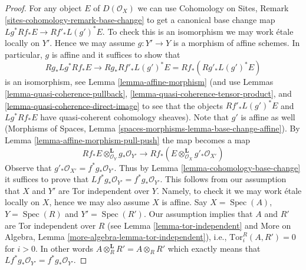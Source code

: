 \documentclass[10pt,a4paper]{amsart}
\theoremstyle{plain}
\theoremstyle{definition}
\theoremstyle{remark}
\numberwithin{equation}{subsection}
\def\Spec{\mathop{\mathrm{Spec}}}
\begin{document}
\begin{proof}
For any object $E$ of $D(\mathcal{O}_X)$ we can use
Cohomology on Sites, Remark \ref{sites-cohomology-remark-base-change}
to get a canonical base change map $Lg^*Rf_*E \to Rf'_*L(g')^*E$. To check this
is an isomorphism we may work \'etale locally on $Y'$. Hence we may assume
$g : Y' \to Y$ is a morphism of affine schemes. In particular, $g$
is affine and it suffices to show that
$$
Rg_*Lg^*Rf_*E \to Rg_*Rf'_*L(g')^*E = Rf_*(Rg'_* L(g')^* E)
$$
is an isomorphism, see Lemma \ref{lemma-affine-morphism}
(and use Lemmas \ref{lemma-quasi-coherence-pullback},
\ref{lemma-quasi-coherence-tensor-product}, and
\ref{lemma-quasi-coherence-direct-image}
to see that the objects $Rf'_*L(g')^*E$ and $Lg^*Rf_*E$
have quasi-coherent cohomology sheaves). Note that $g'$ is
affine as well (Morphisms of Spaces, Lemma
\ref{spaces-morphisms-lemma-base-change-affine}).
By Lemma \ref{lemma-affine-morphism-pull-push} the map becomes a map
$$
Rf_*E \otimes_{\mathcal{O}_Y}^\mathbf{L} g_*\mathcal{O}_{Y'}
\longrightarrow
Rf_*(E \otimes_{\mathcal{O}_X}^\mathbf{L} g'_*\mathcal{O}_{X'})
$$
Observe that $g'_*\mathcal{O}_{X'} = f^*g_*\mathcal{O}_{Y'}$. Thus by
Lemma \ref{lemma-cohomology-base-change} it suffices to prove that
$Lf^*g_*\mathcal{O}_{Y'} = f^*g_*\mathcal{O}_{Y'}$. This follows from our
assumption that $X$ and $Y'$ are Tor independent over $Y$. Namely, to
check it we may work \'etale locally on $X$, hence we may also assume $X$
is affine. Say $X = \Spec(A)$, $Y = \Spec(R)$ and $Y' = \Spec(R')$.
Our assumption implies that $A$ and $R'$ are Tor independent over $R$
(see
Lemma \ref{lemma-tor-independent}
and
More on Algebra, Lemma \ref{more-algebra-lemma-tor-independent}), i.e.,
$\text{Tor}_i^R(A, R') = 0$ for $i > 0$. In other words
$A \otimes_R^\mathbf{L} R' = A \otimes_R R'$ which exactly means
that $Lf^*g_*\mathcal{O}_{Y'} = f^*g_*\mathcal{O}_{Y'}$.
\end{proof}
\end{document}
